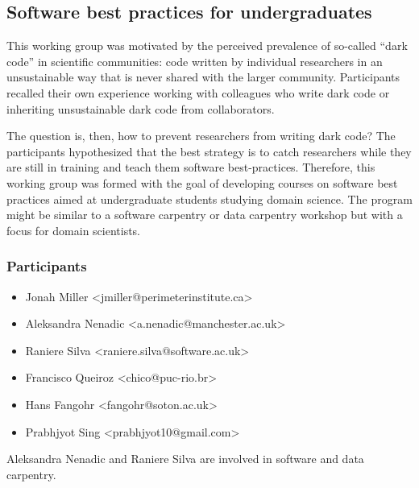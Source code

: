 \subsection{Software best practices for undergraduates}
\label{sec:best-practices-undergrads}



This working group was motivated by the perceived prevalence of
so-called ``dark code'' in scientific communities: code written by
individual researchers in an unsustainable way that is never shared
with the larger community. Participants recalled their own experience
working with colleagues who write dark code or inheriting
unsustainable dark code from collaborators.

The question is, then, how to prevent researchers from writing dark
code? The participants hypothesized that the best strategy is to catch
researchers while they are still in training and teach them software
best-practices. Therefore, this working group was formed with the goal
of developing courses on software best practices aimed at
undergraduate students studying domain science. The program might be
similar to a software carpentry or data carpentry workshop but with a
focus for domain scientists.

\subsubsection{Participants}

\begin{itemize}
  \item Jonah Miller <jmiller@perimeterinstitute.ca>
  \item Aleksandra Nenadic <a.nenadic@manchester.ac.uk>
  \item Raniere Silva <raniere.silva@software.ac.uk>
  \item Francisco Queiroz <chico@puc-rio.br>
  \item Hans Fangohr <fangohr@soton.ac.uk>
  \item Prabhjyot Sing <prabhjyot10@gmail.com>
\end{itemize}

\noindent Aleksandra Nenadic and Raniere Silva are involved
in software and data carpentry.

